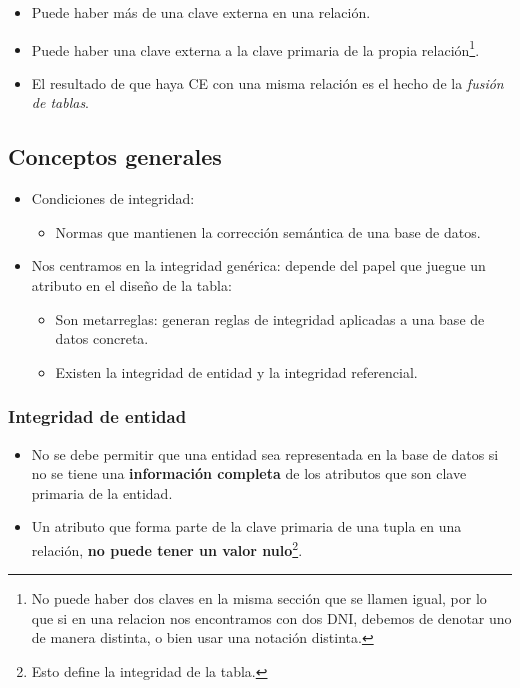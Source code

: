 \begin{itemize}
    \item Puede haber más de una clave externa en una relación.
    \item Puede haber una clave externa a la clave primaria de la propia relación\footnote{No puede haber  dos claves en la misma sección que se llamen igual, por lo que si en una relacion nos encontramos con dos DNI, debemos de denotar uno de manera distinta, o bien usar una notación distinta.}.
    \item El resultado de que haya CE con una misma relación es el hecho de la \textit{fusión de tablas}.
\end{itemize}

\subsection*{Conceptos generales}
\begin{itemize}
    \item Condiciones de integridad:
    \begin{itemize}
        \item Normas que mantienen la corrección semántica de una base de datos.
    \end{itemize}
    \item Nos centramos en la integridad genérica: depende del papel que juegue un atributo en el diseño de la tabla:
    \begin{itemize}
        \item Son metarreglas: generan reglas de integridad aplicadas a una base de datos concreta.
        \item Existen la integridad de entidad y la integridad referencial.
    \end{itemize}
\end{itemize}

\subsubsection*{Integridad de entidad}
\begin{itemize}
    \item No se debe permitir que una entidad sea representada en la base de datos si no se tiene una \textbf{información completa} de los atributos que son clave primaria de la entidad.
    \item Un atributo que forma parte de la clave primaria de una tupla en una relación, \textbf{no puede tener un valor nulo}\footnote{Esto define la integridad de la tabla.}.
\end{itemize}

